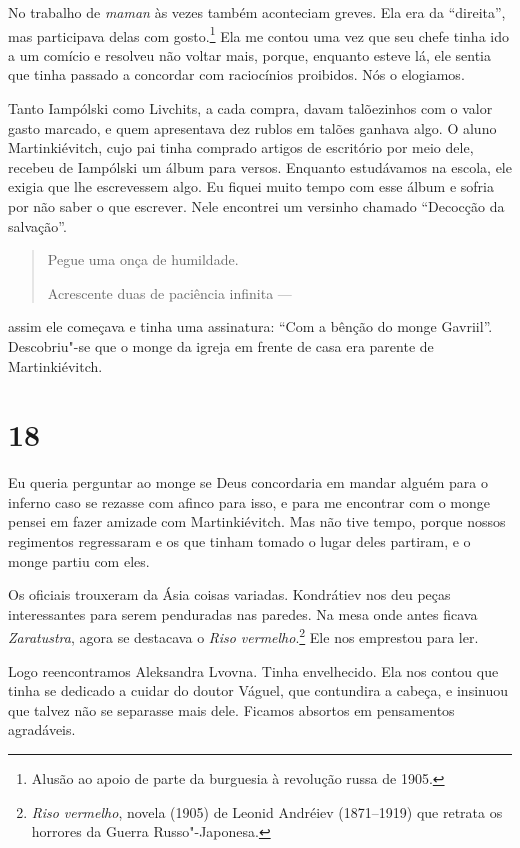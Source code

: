 No trabalho de \emph{maman} às vezes também aconteciam greves. Ela era
da ``direita'', mas participava delas com gosto.\footnote{Alusão ao
  apoio de parte da burguesia à revolução russa de 1905.} Ela me contou
uma vez que seu chefe tinha ido a um comício e resolveu não voltar mais,
porque, enquanto esteve lá, ele sentia que tinha passado a concordar com
raciocínios proibidos. Nós o elogiamos.

Tanto Iampólski como Livchits, a cada compra, davam talõezinhos com o
valor gasto marcado, e quem apresentava dez rublos em talões ganhava
algo. O aluno Martinkiévitch, cujo pai tinha comprado artigos de
escritório por meio dele, recebeu de Iampólski um álbum para versos.
Enquanto estudávamos na escola, ele exigia que lhe escrevessem algo. Eu
fiquei muito tempo com esse álbum e sofria por não saber o que escrever.
Nele encontrei um versinho chamado ``Decocção da salvação''.

\begin{quotation}
Pegue uma onça de humildade.

Acrescente duas de paciência infinita ---
\end{quotation}

assim ele começava e tinha uma assinatura: ``Com a bênção do monge
Gavriil''. Descobriu"-se que o monge da igreja em frente de casa era
parente de Martinkiévitch.

\section{18}

Eu queria perguntar ao monge se Deus concordaria em mandar alguém para o
inferno caso se rezasse com afinco para isso, e para me encontrar com o
monge pensei em fazer amizade com Martinkiévitch. Mas não tive tempo,
porque nossos regimentos regressaram e os que tinham tomado o lugar
deles partiram, e o monge partiu com eles.

Os oficiais trouxeram da Ásia coisas variadas. Kondrátiev nos deu peças
interessantes para serem penduradas nas paredes. Na mesa onde antes
ficava \emph{Zaratustra}, agora se destacava o \emph{Riso
vermelho}.\footnote{\emph{Riso vermelho}, novela (1905) de Leonid
  Andréiev (1871--1919) que retrata os horrores da Guerra
  Russo"-Japonesa.} Ele nos emprestou para ler.

Logo reencontramos Aleksandra Lvovna. Tinha envelhecido. Ela nos contou
que tinha se dedicado a cuidar do doutor Váguel, que contundira a
cabeça, e insinuou que talvez não se separasse mais dele. Ficamos
absortos em pensamentos agradáveis.

